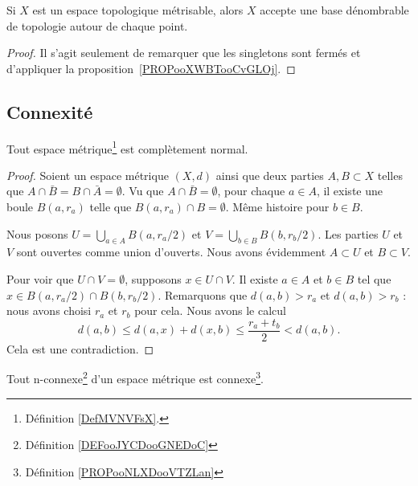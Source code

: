 \begin{corollary}       \label{CORooTWFYooCNMieM}
	Si \( X\) est un espace topologique métrisable, alors \( X\) accepte une base dénombrable de topologie autour de chaque point.
\end{corollary}

\begin{proof}
	Il s'agit seulement de remarquer que les singletons sont fermés et d'appliquer la proposition~\ref{PROPooXWBTooCvGLOj}.
\end{proof}

\subsection{Connexité}


\begin{proposition}	\label{PROPooUQNTooAegKwA}
	Tout espace métrique\footnote{Définition \ref{DefMVNVFsX}.} est complètement normal.
\end{proposition}

\begin{proof}
	Soient un espace métrique \( (X,d)\) ainsi que deux parties \( A,B\subset X\) telles que \( A\cap \bar B=B\cap\bar A=\emptyset\). Vu que \( A\cap \bar B=\emptyset\), pour chaque \( a\in A\), il existe une boule \( B(a,r_a)\) telle que \( B(a,r_a)\cap B=\emptyset\). Même histoire pour \( b\in B\).

	Nous posons \( U=\bigcup_{a\in A}B(a,r_a/2)\) et \( V=\bigcup_{b\in B}B(b,r_b/2)\). Les parties \( U\) et \( V\) sont ouvertes comme union d'ouverts. Nous avons évidemment \( A\subset U\) et \( B\subset V\).

	Pour voir que \( U\cap V=\emptyset\), supposons \( x\in U\cap V\). Il existe \( a\in A\) et \( b\in B\) tel que \( x\in B(a,r_a/2)\cap B(b,r_b/2)\). Remarquons que \( d(a,b)>r_a\) et \( d(a,b)>r_b\) : nous avons choisi \( r_a\) et \( r_b\) pour cela. Nous avons le calcul
	\begin{equation}
		d(a,b)  \leq d(a,x)+d(x,b)
		\leq \frac{ r_a+t_b }{2}
		<d(a,b).
	\end{equation}
	Cela est une contradiction.
\end{proof}

\begin{proposition}	\label{PROPooBMFBooIQJMNC}
	Tout n-connexe\footnote{Définition \ref{DEFooJYCDooGNEDoC}} d'un espace métrique est connexe\footnote{Définition \ref{PROPooNLXDooVTZLan}}.
\end{proposition}

